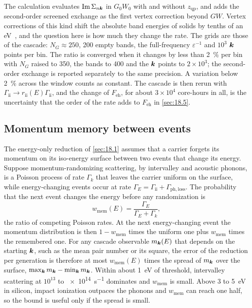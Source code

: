 The calculation evaluates $\operatorname{Im}\Sigma_{n\bm{k}}$ in $G_0W_0$ with and without $z_{\mathrm{qp}}$, and adds the second-order screened exchange as the first vertex correction beyond $GW$. Vertex corrections of this kind shift the absolute band energies of solids by tenths of an eV~\cite{grueneis2014ionization}, and the question here is how much they change the rate. The grids are those of the cascade: $N_G \approx 250$, 200 empty bands, the full-frequency $\varepsilon^{-1}$ and $10^3$ $\bm{k}$ points per bin. The ratio is converged when it changes by less than \SI{2}{\percent} per bin with $N_G$ raised to 350, the bands to 400 and the $\bm{k}$ points to $2\times10^3$; the second-order exchange is reported separately to the same precision. A variation below \SI{2}{\percent} across the window counts as constant. The cascade is then rerun with $\varGamma_{\mathrm{ii}} \to r_{\mathrm{ii}}(E)\varGamma_{\mathrm{ii}}$, and the change of $F_{\mathrm{eh}}$, for about $3\times10^4$ core-hours in all, is the uncertainty that the order of the rate adds to $F_{\mathrm{eh}}$ in \cref{sec:18.5}.

\subsection{Momentum memory between events}

The energy-only reduction of \cref{sec:18.1} assumes that a carrier forgets its momentum on its iso-energy surface between two events that change its energy. Suppose momentum-randomizing scattering, by intervalley and acoustic phonons, is a Poisson process of rate $\varGamma_k$ that leaves the carrier uniform on the surface, while energy-changing events occur at rate $\varGamma_E = \varGamma_{\mathrm{ii}} + \varGamma_{\mathrm{ph,loss}}$. The probability that the next event changes the energy before any randomization is
\begin{equation}
  w_{\mathrm{mem}}(E) = \frac{\varGamma_E}{\varGamma_E + \varGamma_k} ,
  \label{eq:E.24-wmem}
\end{equation}
the ratio of competing Poisson rates. At the next energy-changing event the momentum distribution is then $1 - w_{\mathrm{mem}}$ times the uniform one plus $w_{\mathrm{mem}}$ times the remembered one. For any cascade observable $m_{\bm{k}}(E)$ that depends on the starting $\bm{k}$, such as the mean pair number or its square, the error of the reduction per generation is therefore at most $w_{\mathrm{mem}}(E)$ times the spread of $m_{\bm{k}}$ over the surface, $\max_{\bm{k}}m_{\bm{k}} - \min_{\bm{k}}m_{\bm{k}}$. Within about \SI{1}{eV} of threshold, intervalley scattering at $10^{13}$ to \SI{e14}{s^{-1}} dominates and $w_{\mathrm{mem}}$ is small. Above 3 to \SI{5}{eV} in silicon, impact ionization outpaces the phonons and $w_{\mathrm{mem}}$ can reach one half, so the bound is useful only if the spread is small.

